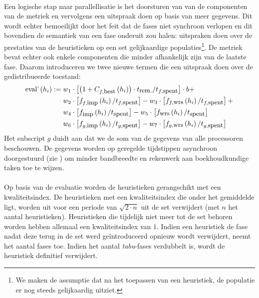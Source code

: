 \paragraph{}
Een logische stap naar parallellisatie is het doorsturen van van de componenten van de metriek en vervolgens een uitspraak doen op basis van meer gegevens. Dit wordt echter bemoeilijkt door het feit dat de fases niet synchroon verlopen en dit bovendien de semantiek van een fase onderuit zou halen: uitspraken doen over de prestaties van de heuristieken op een set gelijkaardige populaties\footnote{We maken de assumptie dat na het toepassen van een heuristiek, de populatie er nog steeds gelijkaardig uitziet.}. De metriek bevat echter ook enkele componenten die minder afhankelijk zijn van de laatste fase. Daarom introduceren we twee nieuwe termen die een uitspraak doen over de gedistribueerde toestand:
\begin{align*}
\mbox{eval'}\left(h_i\right):={}&w_1\cdot\left[\left(1+C_{f,\mbox{\small{best}}}\left(h_i\right)\right)\cdot t_{\mbox{\small{rem.}}}/t_{f,\mbox{\small{spent}}}\right]\cdot b+\\
&w_2\cdot\left[f_{f,\mbox{\small{imp}}}\left(h_i\right)/t_{f,\mbox{\small{spent}}}\right]-w_3\cdot\left[f_{f,\mbox{\small{wrs}}}\left(h_i\right)/t_{f,\mbox{\small{spent}}}\right]+\\
&w_4\cdot\left[f_{\mbox{\small{imp}}}\left(h_i\right)/t_{\mbox{\small{spent}}}\right]-w_5\cdot\left[f_{\mbox{\small{wrs}}}\left(h_i\right)/t_{\mbox{\small{spent}}}\right]\\
&w_6\cdot\left[f_{g,\mbox{\small{imp}}}\left(h_i\right)/t_{g,\mbox{\small{spent}}}\right]-w_7\cdot\left[f_{g,\mbox{\small{wrs}}}\left(h_i\right)/t_{g,\mbox{\small{spent}}}\right]
\end{align*}
Het subscript $g$ duidt aan dat we de som van de gegevens van alle processoren beschouwen. De gegevens worden op geregelde tijdstippen asynchroon doorgestuurd (zie ) om minder bandbreedte en rekenwerk aan boekhoudkundige taken toe te wijzen.

\paragraph{}
Op basis van de evaluatie worden de heuristieken gerangschikt met een kwaliteitsindex. De heuristieken met een kwaliteitsindex die onder het gemiddelde ligt, worden uit voor een periode van $\sqrt{2\cdot n}$ uit de set verwijdert (met $n$ het aantal heuristieken). Heuristieken die tijdelijk niet meer tot de set behoren worden hebben allemaal een kwaliteitsindex van $1$. Indien een heuristiek de fase nadat deze terug in de set werd ge\"introduceerd opnieuw wordt verwijdert, neemt het aantal fases toe. Indien het aantal \emph{tabu}-fases verdubbelt is, wordt de heuristiek definitief verwijdert.